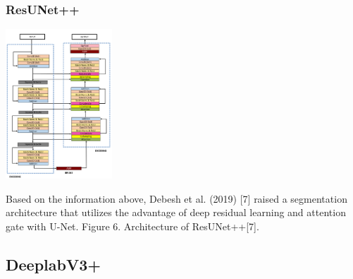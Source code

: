 \documentclass[conference]{IEEEtran}
\begin{document}
\subsubsection{ResUNet++}
\centerline{\includegraphics[width=40mm,scale=0.5]{group/Picture7.png}}
Based on the information above, Debesh et al. (2019) [7] raised a segmentation architecture that utilizes the advantage of deep residual learning and attention gate with U-Net.
Figure 6. Architecture of ResUNet++[7].
\subsection{DeeplabV3+}
\end{document}
